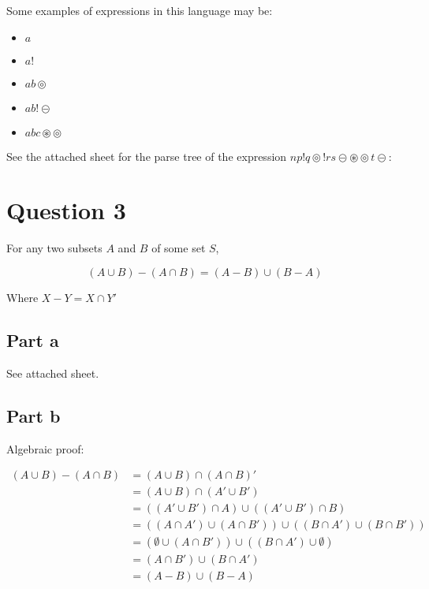 \documentclass{article}
\begin{document}
Some examples of expressions in this language may be:

\begin{itemize}
    \item $a$
    \item $a!$
    \item $ab\circledcirc$
    \item $ab!\circleddash$
    \item $abc\circledast\circledcirc$
\end{itemize}

See the attached sheet for the parse tree of the expression $np!q\circledcirc!rs\circleddash\circledast\circledcirc t\circleddash$:

\newpage

\section*{Question 3}

For any two subsets $A$ and $B$ of some set $S$,

\[
    (A \cup B) - (A \cap B) = (A - B) \cup (B - A)
\]

Where $X - Y = X \cap Y'$

\subsection*{Part a}

See attached sheet.

\subsection*{Part b}

Algebraic proof:

\[
    \begin{split}
    (A \cup B) - (A \cap B) &= (A \cup B) \cap (A \cap B)'\\
                            &= (A \cup B) \cap (A' \cup B')\\
                            &= ((A' \cup B') \cap A) \cup ((A' \cup B') \cap B)\\
                            &= ((A \cap A') \cup (A \cap B')) \cup ((B \cap A') \cup (B \cap B'))\\
                            &= (\emptyset \cup (A \cap B')) \cup ((B \cap A') \cup \emptyset)\\
                            &= (A \cap B') \cup (B \cap A')\\
                            &= (A - B) \cup (B - A)
    \end{split}    
\]
\end{document}
